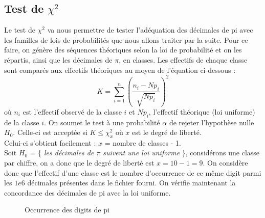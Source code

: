 \documentclass[10pt,a4paper]{article}
\begin{document}
\subsection{Test de $\chi^2$}
Le test de $\chi^2$ va nous permettre de tester l'adéquation des décimales de pi avec les familles de lois de probabilités que nous allons traiter par la suite. Pour ce faire, on génère des séquences théoriques selon la loi de probabilité et on les répartis, ainsi que les décimales de $\pi$, en classes. Les effectifs de chaque classe sont comparés aux effectifs théoriques au moyen de l'équation ci-dessous :
\[ K = \displaystyle\sum_{i=1}^n (\frac{n_i-Np_i}{\sqrt{Np_i}})^2\]
où $n_i$ est l'effectif observé de la classe $i$ et $Np_i$, l'effectif théorique (loi uniforme) de la classe $i$. On soumet le test à une probabilité $\alpha$ de rejeter l'hypothèse nulle $H_0$. Celle-ci est acceptée si $K \leq \chi_x^2$ où $x$ est le degré de liberté. \\Celui-ci s'obtient facilement : $x$ = nombre de classes - 1. \\

Soit $H_0$ = \{\textit{ les décimales de $\pi$ suivent une loi uniforme }\}, considérons une classe par chiffre, on a donc que le degré de liberté est $x = 10 - 1 = 9 $. On considère donc que l'effectif d'une classe est le nombre d'occurrence de ce même digit parmi les $1e6$ décimales présentes dans le fichier fourni. On vérifie maintenant la concordance des décimales de pi avec la loi uniforme.
\begin{figure}[h!]
\caption{Occurrence des digits de pi}
\label{khi2histo}
\end{figure}
\end{document}
